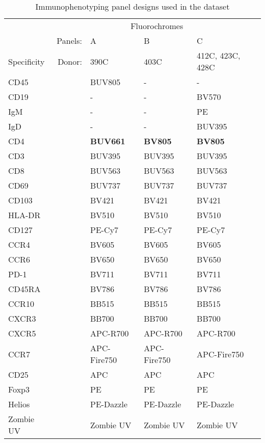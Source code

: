 \begin{table}
\footnotesize
\begin{center}
    \begin{tabular}{lrlll}
        \toprule
        & \multicolumn{4}{c}{Fluorochromes} \\
        \cmidrule{3-5}
         & Panels:&  A &  B &  C \\
        \cmidrule{3-5}
        Specificity & Donor:& 390C & 403C & 412C, 423C, 428C \\
        \midrule
        CD45 && BUV805 & - & - \\
        CD19 && - & - & BV570 \\
        IgM && - & - & PE \\
        IgD && - & - & BUV395 \\
        CD4 && \textbf{BUV661} & \textbf{BV805} & \textbf{BV805} \\
        CD3 &&  BUV395 & BUV395 & BUV395 \\
        CD8 && BUV563 & BUV563 & BUV563 \\
        CD69 && BUV737 & BUV737 & BUV737 \\
        CD103 && BV421 & BV421 & BV421 \\
        HLA-DR && BV510 & BV510 & BV510 \\
        CD127 && PE-Cy7 & PE-Cy7 & PE-Cy7 \\
        CCR4 && BV605 & BV605 & BV605 \\
        CCR6 && BV650 & BV650 & BV650 \\
        PD-1 && BV711 & BV711 & BV711 \\
        CD45RA && BV786 & BV786 & BV786 \\
        CCR10 && BB515 & BB515 & BB515 \\
        CXCR3 && BB700 & BB700 & BB700 \\
        CXCR5 && APC-R700 & APC-R700 & APC-R700 \\
        CCR7 && APC-Fire750 & APC-Fire750 & APC-Fire750 \\
        CD25 && APC & APC & APC \\
        Foxp3 && PE & PE & PE \\
        Helios && PE-Dazzle & PE-Dazzle & PE-Dazzle \\
        Zombie UV && Zombie UV & Zombie UV & Zombie UV \\
        \bottomrule
    \end{tabular}
\caption{Immunophenotyping panel designs used in the dataset}
\label{table:panels}
\end{center}
\end{table}